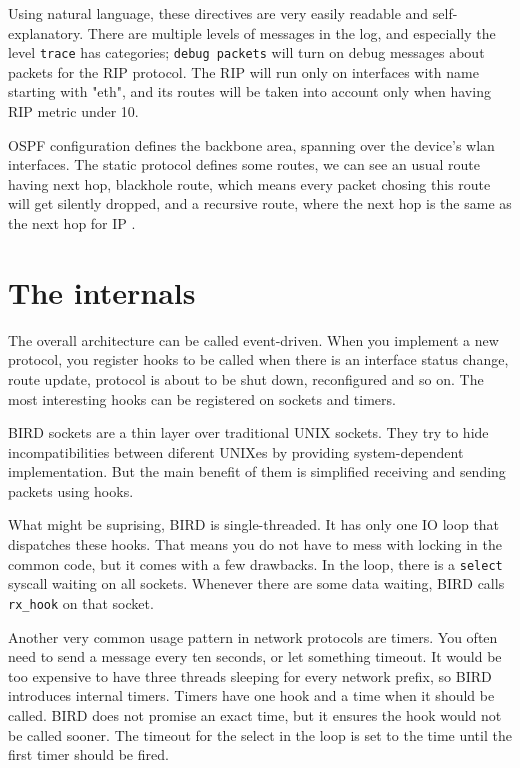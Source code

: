 

Using natural language, these directives are very easily readable and
self-explanatory. There are multiple levels of messages in the log, and
especially the level \texttt{trace} has categories; \texttt{debug packets}
will turn on debug messages about packets for the RIP protocol. The RIP will
run only on interfaces with name starting with "eth", and its routes will be
taken into account only when having RIP metric under 10.

OSPF configuration defines the backbone area, spanning over the device's wlan
interfaces. The static protocol defines some routes, we can see an usual route
having next hop, blackhole route, which means every packet chosing this route
will get silently dropped, and a recursive route, where the next hop is the
same as the next hop for IP .

\section{The internals}
\label{bird-internals}
The overall architecture can be called event-driven. When you implement a new
protocol, you register hooks to be called when there is an interface status
change, route update, protocol is about to be shut down, reconfigured and so on.
The most interesting hooks can be registered on sockets and timers.

BIRD sockets are a thin layer over traditional UNIX sockets. They try to hide
incompatibilities between diferent UNIXes by providing system-dependent
implementation. But the main benefit of them is simplified receiving and
sending packets using hooks.

What might be suprising, BIRD is single-threaded. It has only one IO loop that
dispatches these hooks. That means you do not have to mess with locking in the
common code, but it comes with a few drawbacks. In the loop, there is
a \texttt{select} syscall waiting on all sockets. Whenever there are some data
waiting, BIRD calls \verb|rx_hook| on that socket.

Another very common usage pattern in network protocols are timers. You often
need to send a message every ten seconds, or let something timeout. It would be
too expensive to have three threads sleeping for every network prefix, so BIRD
introduces internal timers. Timers have one hook and a time when it should be
called. BIRD does not promise an exact time, but it ensures the hook would not
be called sooner. The timeout for the select in the loop is set to the time
until the first timer should be fired.

